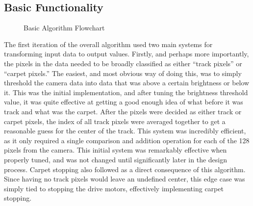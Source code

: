 \documentclass[conference]{IEEEtran}
\begin{document}
\subsection{Basic Functionality}

\begin{figure}[h]
    \centering
    \caption{Basic Algorithm Flowchart}
    \label{firstAlgo}
\end{figure}

    The first iteration of the overall algorithm used two main systems for transforming input data to output values. Firstly,
    and perhaps more importantly, the pixels in the data needed to be broadly classified as either ``track pixels'' or ``carpet pixels.''
    The easiest, and most obvious way of doing this, was to simply threshold the camera data into data that was above a certain brightness or below it.
    This was the initial implementation, and after tuning the brightness threshold value, it was quite effective at getting a good enough idea of
    what before it was track and what was the carpet.
    After the pixels were decided as either track or carpet pixels, the index of all track pixels were averaged together to get a reasonable guess
    for the center of the track.
    This system was incredibly efficient, as it only required a single comparison and addition operation for each of the 128 pixels from the camera.
    This initial system was remarkably effective when properly tuned, and was not changed until significantly later in the design process.
    Carpet stopping also followed as a direct consequence of this algorithm. Since having no track pixels would leave an undefined center, this edge
    case was simply tied to stopping the drive motors, effectively implementing carpet stopping.
\end{document}
